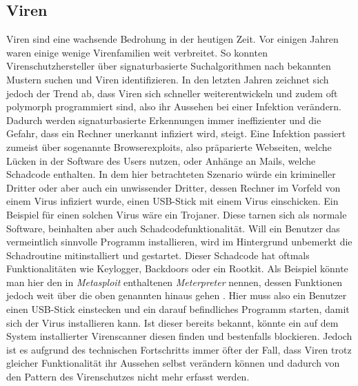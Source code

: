\subsection{Viren}
Viren sind eine wachsende Bedrohung in der heutigen Zeit. Vor einigen Jahren waren einige wenige Virenfamilien weit verbreitet. So konnten Virenschutzhersteller über signaturbasierte Suchalgorithmen nach bekannten Mustern suchen und Viren identifizieren. In den letzten Jahren zeichnet sich jedoch der Trend ab, dass Viren sich schneller weiterentwickeln und zudem oft polymorph programmiert sind, also ihr Aussehen bei einer Infektion verändern. Dadurch werden signaturbasierte Erkennungen immer ineffizienter und die Gefahr, dass ein Rechner unerkannt infiziert wird, steigt. Eine Infektion passiert zumeist über sogenannte Browserexploits, also präparierte Webseiten, welche Lücken in der Software des Users nutzen, oder Anhänge an Mails, welche Schadcode enthalten. In dem hier betrachteten Szenario würde ein krimineller Dritter oder aber auch ein unwissender Dritter, dessen Rechner im Vorfeld von einem Virus infiziert wurde, einen USB-Stick mit einem Virus einschicken. Ein Beispiel für einen solchen Virus wäre ein Trojaner. Diese tarnen sich als normale Software, beinhalten aber auch Schadcodefunktionalität. \cite{Stamp2006} Will ein Benutzer das vermeintlich sinnvolle Programm installieren, wird im Hintergrund unbemerkt die Schadroutine mitinstalliert und gestartet. Dieser Schadcode hat oftmals Funktionalitäten wie Keylogger, Backdoors oder ein Rootkit. Als Beispiel könnte man hier den in \textit{Metasploit}\cite{Metasploit} enthaltenen \textit{Meterpreter} nennen, dessen Funktionen jedoch weit über die oben genannten hinaus gehen \cite{Meterpreter}. Hier muss also ein Benutzer einen USB-Stick einstecken und ein darauf befindliches Programm starten, damit sich der Virus installieren kann. Ist dieser bereits bekannt, könnte ein auf dem System installierter Virenscanner diesen finden und bestenfalls blockieren. Jedoch ist es aufgrund des technischen Fortschritts immer öfter der Fall, dass Viren trotz gleicher Funktionalität ihr Aussehen selbst verändern können und dadurch von den Pattern des Virenschutzes nicht mehr erfasst werden.
			
